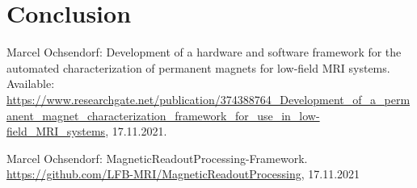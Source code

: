 \documentclass[conference]{IEEEtran}
\begin{document}

\section{Conclusion}


\begingroup
\begin{thebibliography}{00}
 Marcel Ochsendorf: Development of a hardware and software framework for the automated characterization of permanent magnets for low-field MRI systems. Available: \url{https://www.researchgate.net/publication/374388764_Development_of_a_permanent_magnet_characterization_framework_for_use_in_low-field_MRI_systems}, 17.11.2021.

\vskip 0.05in
 Marcel Ochsendorf: MagneticReadoutProcessing-Framework. \url{https://github.com/LFB-MRI/MagneticReadoutProcessing}, 17.11.2021


\end{thebibliography}
\endgroup
\end{document}
